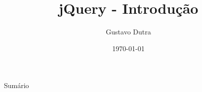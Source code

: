 \documentclass{beamer}
\title{jQuery - Introdução}
\author{Gustavo Dutra}
\institute{http://gustavodutra.com}
\date{\today}
\begin{document}
\begin{frame}
\titlepage
\end{frame}

\begin{frame}{Sumário}
	\tableofcontents
\end{frame}













\end{document}
